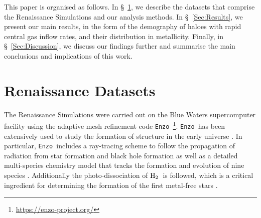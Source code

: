 \documentclass[twocolumn,iop,revtex4]{openjournal}
\newcommand{\enzo}{\texttt{Enzo~}}
\newcommand{\molH} {$\rm{H_2}$~}
\begin{document}
This paper is organised as follows.
In \S~\ref{Sec:RenaissanceDatasets}, we describe the datasets that comprise the Renaissance Simulations
and our analysis methods.
In \S~\ref{Sec:Results}, we present  our main results, in the form of the demography of
haloes with rapid central gas inflow rates, and their distribution in metallicity.  
Finally, in \S~\ref{Sec:Discussion}, 
we discuss our findings further and summarise the main conclusions and implications of this work.

\section{Renaissance Datasets} \label{Sec:RenaissanceDatasets}
The Renaissance Simulations were carried out on the Blue Waters supercomputer facility using the
adaptive mesh refinement code \enzo\citep{Enzo_2014, Enzo_2019}\footnote{\url{https://enzo-project.org/}}.
\enzo has been extensively used to study the formation of structure in the early universe
\citep{Abel_2002, OShea_2005b, Turk_2012, Wise_2012b, Wise_2014, Regan_2015, Regan_2017}. In
particular, \enzo includes a ray-tracing scheme to follow the propagation of radiation from star
formation and
black hole formation \citep{WiseAbel_2011} as well as a detailed multi-species chemistry model that
tracks the formation and evolution of nine species \citep{Anninos_1997, Abel_1997, Grackle}.
Additionally the photo-dissociation of \molH is followed, which is a critical ingredient for
determining the formation of the first metal-free stars \citep{Haiman_2000}.
\end{document}
